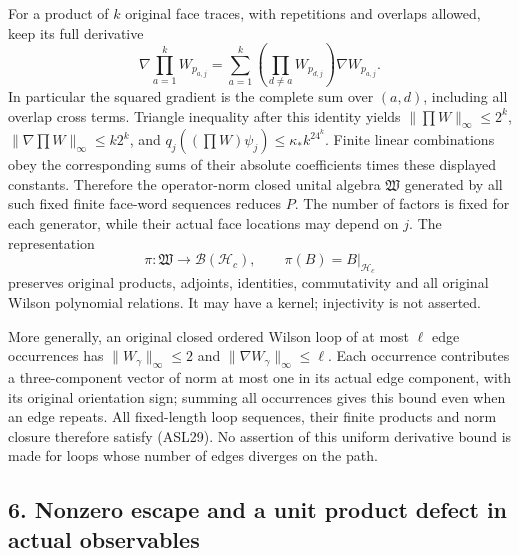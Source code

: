 \documentclass[11pt]{article}
\begin{document}
For a product of \(k\) original face traces, with repetitions and overlaps allowed, keep its full derivative
\[
 \nabla\prod_{a=1}^kW_{p_{a,j}}
 =\sum_{a=1}^k\left(\prod_{d\ne a}W_{p_{d,j}}\right)\nabla W_{p_{a,j}}.
 \tag{ASL28}
\]
In particular the squared gradient is the complete sum over \((a,d)\), including all overlap cross terms. Triangle inequality after this identity yields \(\|\prod W\|_\infty\le2^k\), \(\|\nabla\prod W\|_\infty\le k2^k\), and \(q_j((\prod W)\psi_j)\le\kappa_*k^24^k\). Finite linear combinations obey the corresponding sums of their absolute coefficients times these displayed constants. Therefore the operator-norm closed unital algebra \(\mathfrak W\) generated by all such fixed finite face-word sequences reduces \(P\). The number of factors is fixed for each generator, while their actual face locations may depend on \(j\). The representation
\[
 \pi:\mathfrak W\longrightarrow\mathcal B(\mathcal H_c),\qquad
 \pi(B)=B|_{\mathcal H_c}
 \tag{ASL29}
\]
preserves original products, adjoints, identities, commutativity and all original Wilson polynomial relations. It may have a kernel; injectivity is not asserted.

More generally, an original closed ordered Wilson loop of at most \(\ell\) edge occurrences has \(\|W_\gamma\|_\infty\le2\) and \(\|\nabla W_\gamma\|_\infty\le\ell\). Each occurrence contributes a three-component vector of norm at most one in its actual edge component, with its original orientation sign; summing all occurrences gives this bound even when an edge repeats. All fixed-length loop sequences, their finite products and norm closure therefore satisfy (ASL29). No assertion of this uniform derivative bound is made for loops whose number of edges diverges on the path.

\subsection*{6. Nonzero escape and a unit product defect in actual observables}
\end{document}
